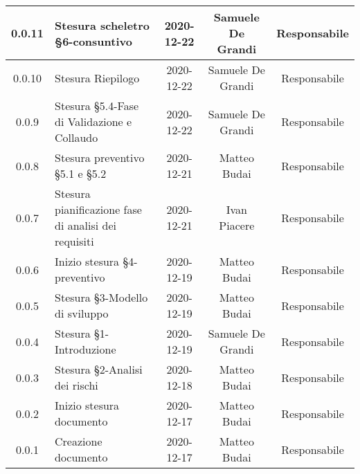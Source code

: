 \begin{center}
\begin{longtable}{|c|p{5cm}|c|c|c|}
	\hline
	0.0.11 & Stesura scheletro §6-consuntivo & 2020-12-22 & Samuele De Grandi & Responsabile \\
	\hline
	0.0.10 & Stesura Riepilogo & 2020-12-22 & Samuele De Grandi & Responsabile \\
	\hline
	0.0.9 & Stesura §5.4-Fase di Validazione e Collaudo & 2020-12-22 & Samuele De Grandi & Responsabile \\
	\hline
	0.0.8 & Stesura preventivo §5.1 e §5.2 & 2020-12-21 & Matteo Budai & Responsabile \\
	\hline
	0.0.7 & Stesura pianificazione fase di analisi dei requisiti & 2020-12-21 & Ivan Piacere & Responsabile \\
	\hline
	0.0.6 & Inizio stesura §4-preventivo & 2020-12-19 & Matteo Budai & Responsabile \\
	\hline
	0.0.5 & Stesura §3-Modello di sviluppo & 2020-12-19 & Matteo Budai & Responsabile \\
	\hline
	0.0.4 & Stesura §1-Introduzione & 2020-12-19 & Samuele De Grandi & Responsabile \\
	\hline
	0.0.3 & Stesura §2-Analisi dei rischi & 2020-12-18 & Matteo Budai & Responsabile \\
	\hline
	0.0.2 & Inizio stesura documento & 2020-12-17 & Matteo Budai & Responsabile \\
	\hline
	0.0.1 & Creazione documento & 2020-12-17 & Matteo Budai & Responsabile \\
	\hline

	\end{longtable}
\end{center}